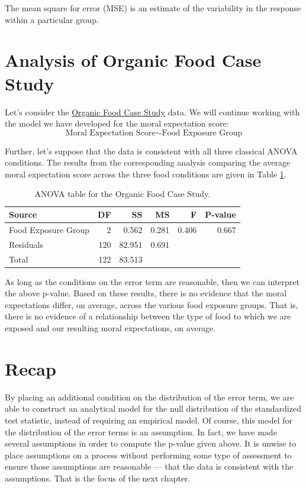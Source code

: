 \documentclass[]{book}
\theoremstyle{definition}
\theoremstyle{definition}
\theoremstyle{remark}
\let\BeginKnitrBlock\begin \let\EndKnitrBlock\end
\begin{document}
\BeginKnitrBlock{rmdtip}
The mean square for error (MSE) is an estimate of the variability in the
response within a particular group.
\EndKnitrBlock{rmdtip}

\section{Analysis of Organic Food Case
Study}\label{analysis-of-organic-food-case-study}

Let's consider the \protect\hyperlink{CaseOrganic}{Organic Food Case
Study} data. We will continue working with the model we have developed
for the moral expectation score:
\[\text{Moral Expectation Score} \sim \text{Food Exposure Group}\]

Further, let's suppose that the data is consistent with all three
classical ANOVA conditions. The results from the corresponding analysis
comparing the average moral expectation score across the three food
conditions are given in Table
\ref{tab:anovaclassical-organic-anova-table}.

\begin{table}

\caption{\label{tab:anovaclassical-organic-anova-table}ANOVA table for the Organic Food Case Study.}
\centering
\begin{tabular}[t]{l|r|r|r|r|r}
\hline
Source & DF & SS & MS & F & P-value\\
\hline
Food Exposure Group & 2 & 0.562 & 0.281 & 0.406 & 0.667\\
\hline
Residuals & 120 & 82.951 & 0.691 &  & \\
\hline
Total & 122 & 83.513 &  &  & \\
\hline
\end{tabular}
\end{table}

As long as the conditions on the error term are reasonable, then we can
interpret the above p-value. Based on these results, there is no
evidence that the moral expectations differ, on average, across the
various food exposure groups. That is, there is no evidence of a
relationship between the type of food to which we are exposed and our
resulting moral expectations, on average.

\section{Recap}\label{recap-1}

By placing an additional condition on the distribution of the error
term, we are able to construct an analytical model for the null
distribution of the standardized test statistic, instead of requiring an
empirical model. Of course, this model for the distribution of the error
terms is an assumption. In fact, we have made several assumptions in
order to compute the p-value given above. It is unwise to place
assumptions on a process without performing some type of assessment to
ensure those assumptions are reasonable --- that the data is consistent
with the assumptions. That is the focus of the next chapter.
\end{document}
